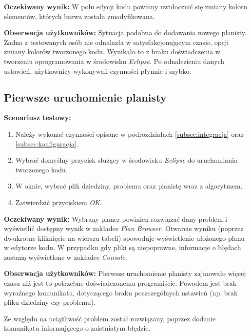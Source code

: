 \textbf{Oczekiwany wynik:} W polu edycji kodu powinny uwidocznić się zmiany koloru elementów, których barwa została zmodyfikowana.

\textbf{Obserwacja użytkowników:} Sytuacja podobna do dodawania nowego planisty. Żadna z testowanych osób nie odnalazła w satysfakcjonującym czasie, opcji zmiany kolorów tworzonego kodu. Wynikało to z braku doświadczenia w tworzeniu oprogramowania w środowisku \textit{Eclipse}. Po odnalezieniu danych ustawień, użytkownicy wykonywali czynności płynnie i szybko. 
\subsection{Pierwsze uruchomienie planisty}
\textbf{Scenariusz testowy:}
  \begin{enumerate}
  
\item Należy wykonać czynności opisane w podrozdziałach \ref{subsec:integracja} oraz \ref{subsec:konfiguracja}.
\item Wybrać domyślny przycisk służący w środowisku \textit{Eclipse} do uruchamiania tworzonego kodu.
\item W oknie, wybrać plik dziedziny, problemu oraz planistę wraz z algorytmem.
\item Zatwierdzić przyciskiem \textit{OK}. 
\end{enumerate}

\textbf{Oczekiwany wynik:} Wybrany planer powinien rozwiązać dany problem i wyświetlić dostępny wynik w zakładce \textit{Plan Browser}. Otwarcie wyniku (poprzez dwukrotne kliknięcie na wierszu tabeli) spowoduje wyświetlenie ułożonego planu w edytorze kodu. W przypadku gdy pliki są niepoprawne, informacje o błędach zostaną wyświetlone w zakładce \textit{Console}. 

\textbf{Obserwacja użytkowników:} Pierwsze uruchomienie planisty zajmowało więcej czasu niż jest to potrzebne doświadczonemu programiście. Powodem jest brak wyraźnego komunikatu, dotyczącego braku poszczególnych ustawień (np. brak pliku dziedziny czy problemu).

Ze względu na uciążliwość problem został rozwiązany, poprzez dodanie komunikatu informującego o zaistniałym błędzie.




